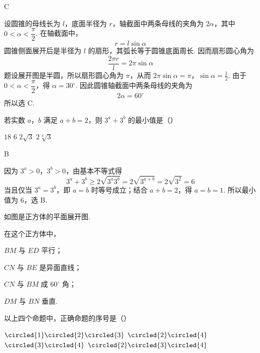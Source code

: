 \begin{answer}
C
\end{answer}

\begin{solution}
设圆锥的母线长为 \(l\)，底面半径为 \(r\)，轴截面中两条母线的夹角为 \(2\alpha\)，其中 \(0<\alpha<\dfrac{\pi}{2}\). 在轴截面中，
\[
r=l\sin\alpha
\]
圆锥侧面展开后是半径为 \(l\) 的扇形，其弧长等于圆锥底面周长. 因而扇形圆心角为
\[
\frac{2\pi r}{l}=2\pi\sin\alpha
\]
题设展开图是半圆，所以扇形圆心角为 \(\pi\)，从而
\(2\pi\sin\alpha=\pi\)，\(\sin\alpha=\frac12\).
由于 \(0<\alpha<\dfrac{\pi}{2}\)，得 \(\alpha=30^{\circ}\). 因此圆锥轴截面中两条母线的夹角为
\[
2\alpha=60^{\circ}
\]
所以选 C.
\end{solution}

\begin{problem}
若实数 \(a\)，\(b\) 满足 \(a + b = 2\)，则 \(3^{a} + 3^{b}\) 的最小值是（\quad）

\choices
    {\(18\)}
    {\(6\)}
    {\(2\sqrt{3}\)}
    {\(2\sqrt[4]{3}\)}
\end{problem}

\begin{answer}
B
\end{answer}

\begin{solution}
因为 \(3^a>0\)，\(3^b>0\)，由基本不等式得
\[
3^a+3^b\geqslant2\sqrt{3^a3^b}=2\sqrt{3^{a+b}}=2\sqrt{3^2}=6
\]
当且仅当 \(3^a=3^b\)，即 \(a=b\) 时等号成立；结合 \(a+b=2\)，得 \(a=b=1\). 所以最小值为 \(6\)，选 B.
\end{solution}

\begin{problem}
如图是正方体的平面展开图.

在这个正方体中，

\begin{circlelist}
\item \(BM\) 与 \(ED\) 平行；
\item \(CN\) 与 \(BE\) 是异面直线；
\item \(CN\) 与 \(BM\) 成 \(60^{\circ}\) 角；
\item \(DM\) 与 \(BN\) 垂直.
\end{circlelist}

以上四个命题中，正确命题的序号是（\quad）


\choices
    {\(\circled{1}\circled{2}\circled{3}\)}
    {\(\circled{2}\circled{4}\)}
    {\(\circled{3}\circled{4}\)}
    {\(\circled{2}\circled{3}\circled{4}\)}
\end{problem}

